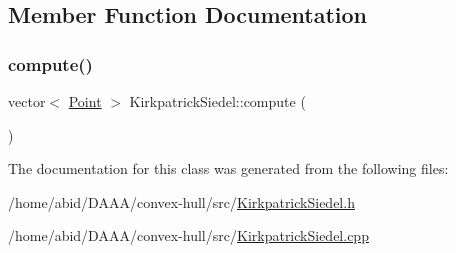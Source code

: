 \subsection{Member Function Documentation}
\mbox{\label{class_kirkpatrick_siedel_ac301f763865d166ed8e049547adeeb44}} 
\subsubsection{\texorpdfstring{compute()}{compute()}}
{\footnotesize\ttfamily vector$<$ \mbox{\hyperlink{class_point}{Point}} $>$ Kirkpatrick\+Siedel\+::compute (\begin{DoxyParamCaption}{ }\end{DoxyParamCaption})}



The documentation for this class was generated from the following files\+:\begin{DoxyCompactItemize}
\item 
/home/abid/\+D\+A\+A\+A/convex-\/hull/src/\mbox{\hyperlink{_kirkpatrick_siedel_8h}{Kirkpatrick\+Siedel.\+h}}\item 
/home/abid/\+D\+A\+A\+A/convex-\/hull/src/\mbox{\hyperlink{_kirkpatrick_siedel_8cpp}{Kirkpatrick\+Siedel.\+cpp}}\end{DoxyCompactItemize}
